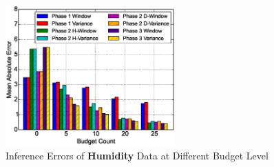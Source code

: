 \documentclass[12pt]{article}  %
\theoremstyle{definition}
\theoremstyle{remark}
\begin{document}
\begin{figure}[H]
\centering
        \includegraphics[width=0.58\textwidth]{../phase3_backinfer/humidity_back_infer_err}
        \caption{Inference Errors of \textbf{Humidity} Data at Different Budget Level}
\label{fig:phase3_back_infer:humidity}
\end{figure}





%
%
%

% 
%


%

\end{document}
